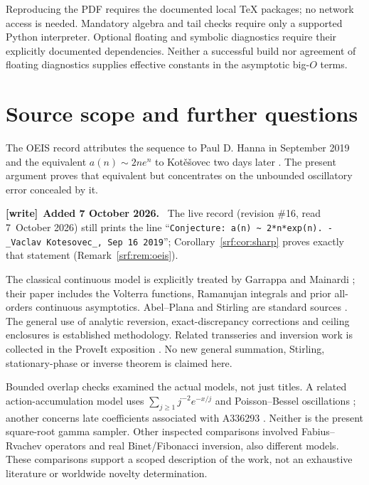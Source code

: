 \documentclass[11pt]{article}
\theoremstyle{remark}\newtheorem{remark}[theorem]{Remark}
\newenvironment{writenote}[1][]{\par\smallskip\begingroup\small
 \noindent\textbf{[write]}\if\relax\detokenize{#1}\relax\else~\textbf{#1.}\fi\ }%
 {\par\endgroup\smallskip}
\begin{document}
Reproducing the PDF requires the documented local TeX packages; no network access is needed. Mandatory algebra and tail checks require only a supported Python interpreter. Optional floating and symbolic diagnostics require their explicitly documented dependencies. Neither a successful build nor agreement of floating diagnostics supplies effective constants in the asymptotic big-$O$ terms.

\section{Source scope and further questions}\label{srf:sec:scope}
The OEIS record attributes the sequence to Paul D. Hanna in September 2019 and the equivalent $a(n)\sim2ne^n$ to Kot\v e\v sovec two days later \cite{oeis}. The present argument proves that equivalent but concentrates on the unbounded oscillatory error concealed by it.

\begin{writenote}[Added 7 October 2026]
The live record (revision \#16, read 7~October 2026) still prints the line
``\texttt{Conjecture: a(n) \textasciitilde{} 2*n*exp(n). - \_Vaclav Kotesovec\_, Sep 16 2019}'';
Corollary~\ref{srf:cor:sharp} proves exactly that statement
(Remark~\ref{srf:rem:oeis}).
\end{writenote}

The classical continuous model is explicitly treated by Garrappa and Mainardi \cite{gm}; their paper includes the Volterra functions, Ramanujan integrals and prior all-orders continuous asymptotics. Abel--Plana and Stirling are standard sources \cite{dlmfap,dlmfgamma}. The general use of analytic reversion, exact-discrepancy corrections and ceiling enclosures is established methodology. Related transseries and inversion work is collected in the ProveIt exposition \cite{inversion}. No new general summation, Stirling, stationary-phase or inverse theorem is claimed here.

Bounded overlap checks examined the actual models, not just titles. A related action-accumulation model uses $\sum_{j\ge1}j^{-2}e^{-x/j}$ and Poisson--Bessel oscillations \cite{action}; another concerns late coefficients associated with A336293 \cite{late}. Neither is the present square-root gamma sampler. Other inspected comparisons involved Fabius--Rvachev operators and real Binet/Fibonacci inversion, also different models. These comparisons support a scoped description of the work, not an exhaustive literature or worldwide novelty determination.
\end{document}
